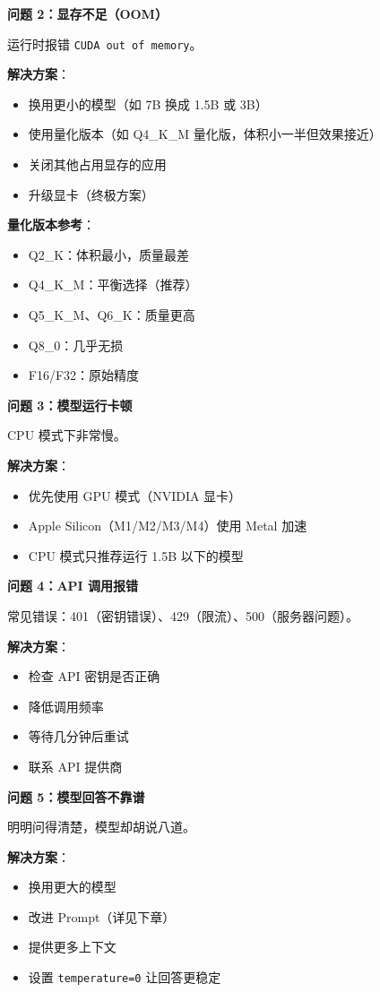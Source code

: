 \documentclass[12pt,UTF8]{ctexbook}
\begin{document}
\textbf{问题 2：显存不足（OOM）}

运行时报错 \texttt{CUDA out of memory}。

\textbf{解决方案}：
\begin{itemize}
  \item 换用更小的模型（如 7B 换成 1.5B 或 3B）
  \item 使用量化版本（如 Q4\_K\_M 量化版，体积小一半但效果接近）
  \item 关闭其他占用显存的应用
  \item 升级显卡（终极方案）
\end{itemize}

\textbf{量化版本参考}：
\begin{itemize}
  \item Q2\_K：体积最小，质量最差
  \item Q4\_K\_M：平衡选择（推荐）
  \item Q5\_K\_M、Q6\_K：质量更高
  \item Q8\_0：几乎无损
  \item F16/F32：原始精度
\end{itemize}

\textbf{问题 3：模型运行卡顿}

CPU 模式下非常慢。

\textbf{解决方案}：
\begin{itemize}
  \item 优先使用 GPU 模式（NVIDIA 显卡）
  \item Apple Silicon（M1/M2/M3/M4）使用 Metal 加速
  \item CPU 模式只推荐运行 1.5B 以下的模型
\end{itemize}

\textbf{问题 4：API 调用报错}

常见错误：401（密钥错误）、429（限流）、500（服务器问题）。

\textbf{解决方案}：
\begin{itemize}
  \item 检查 API 密钥是否正确
  \item 降低调用频率
  \item 等待几分钟后重试
  \item 联系 API 提供商
\end{itemize}

\textbf{问题 5：模型回答不靠谱}

明明问得清楚，模型却胡说八道。

\textbf{解决方案}：
\begin{itemize}
  \item 换用更大的模型
  \item 改进 Prompt（详见下章）
  \item 提供更多上下文
  \item 设置 \texttt{temperature=0} 让回答更稳定
\end{itemize}
\end{document}
